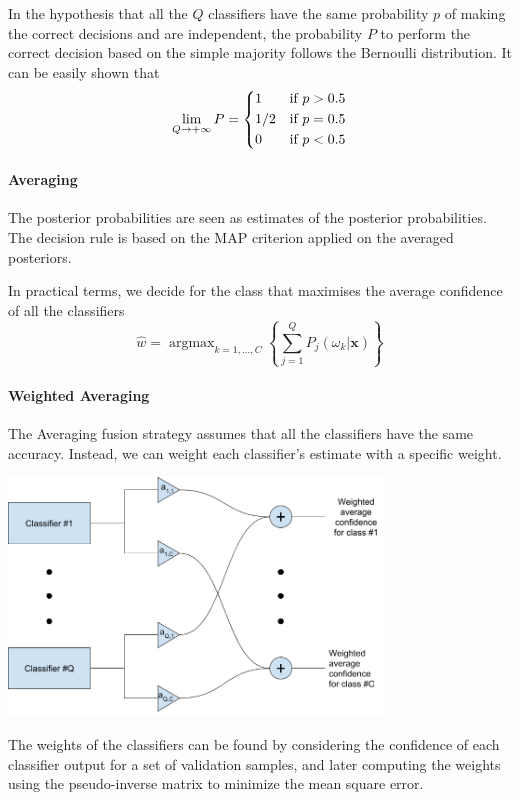 \documentclass[oneside,onecolumn]{report}
\DeclareMathOperator*{\argmax}{argmax}
\begin{document}
In the hypothesis that all the $Q$ classifiers have the same probability $p$ of making the correct decisions and are independent, the probability $P$ to perform the correct decision based on the simple majority follows the Bernoulli distribution.
It can be easily shown that
$$ \lim_{Q \to +\infty} P = \begin{dcases}
    1 & \text{if } p > 0.5 \\
    1/2 & \text{if } p = 0.5 \\
    0 & \text{if } p < 0.5
\end{dcases} $$

\paragraph{Averaging}
The posterior probabilities are seen as estimates of the posterior probabilities.
The decision rule is based on the MAP criterion applied on the averaged posteriors.

In practical terms, we decide for the class that maximises the average confidence of all the classifiers
$$ \widehat w = \argmax_{k = 1,\dots,C} \left\{ \sum_{j = 1}^Q P_j(\omega_k | \bm x) \right\} $$

\paragraph{Weighted Averaging}
The Averaging fusion strategy assumes that all the classifiers have the same accuracy.
Instead, we can weight each classifier's estimate with a specific weight.

\begin{center}
    \includegraphics[width=10cm]{weighted_averaging_fusion_strategy.png}
\end{center}

The weights of the classifiers can be found by considering the confidence of each classifier output for a set of validation samples, and later computing the weights using the pseudo-inverse matrix to minimize the mean square error.
\end{document}
